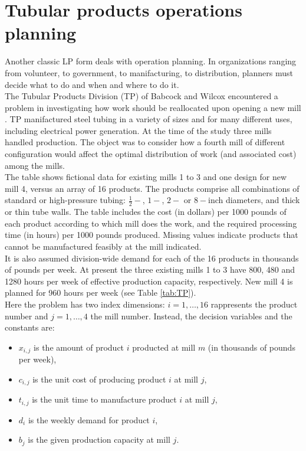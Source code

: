 \documentclass[a4paper,10 pt,titlepage,twoside]{book}
\theoremstyle{plain}
\theoremstyle{definition}
\theoremstyle{remark}
\begin{document}
\section{Tubular products operations planning}
Another classic LP form deals with operation planning. In organizations ranging from volunteer, to government, to manifacturing, to distribution, planners must decide what to do and when and where to do it.\\
The Tubular Products Division (TP) of Babcock and Wilcox encountered a problem in investigating how work should be reallocated upon opening a new mill \cite{FEM}. TP manifactured steel tubing in a variety of sizes and for many different uses, including electrical power generation. At the time of the study three mills handled production. The object was to consider how a fourth mill of different configuration would affect the optimal distribution of work (and associated cost) among the mills.\\ The table shows fictional data for existing mills 1 to 3 and one design for new mill 4, versus an array of 16 products. The products comprise all combinations of standard or high-pressure tubing: $\frac{1}{2}-$, $1-$, $2-$ or $8-$inch diameters, and thick or thin tube walls. The table includes the cost (in dollars) per 1000 pounds of each product according to which mill does the work, and the required processing time (in hours) per 1000 pounds produced. Missing values indicate products that cannot be manufactured feasibly at the mill indicated.\\
It is also assumed division-wide demand for each of the 16 products in thousands of pounds per week. At present the three existing mills 1 to 3 have 800, 480 and 1280 hours per week of effective production capacity, respectively. New mill 4 is planned for 960 hours per week (see Table \ref{tab:TP}).\\
Here the problem has two index dimensions: $i= 1, \dots, 16$ rappresents the product number and $j=1, \dots, 4$ the mill number. Instead, the decision variables and the constants are:
\begin{itemize}
	\item $x_{i,j}$ is the amount of product $i$ producted at mill $m$ (in thousands of pounds per week),
	\item $c_{i,j}$ is the unit cost of producing product $i$ at mill $j$,
	\item $t_{i,j}$ is the unit time to manufacture product $i$ at mill $j$,
	\item $d_{i}$ is the weekly demand for product $i$,
	\item $b_{j}$ is the given production capacity at mill $j$.
\end{itemize}
\end{document}
